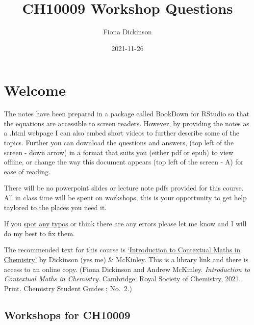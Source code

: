 \documentclass[
]{book}
\title{CH10009 Workshop Questions}
\author{Fiona Dickinson}
\date{2021-11-26}
\begin{document}
\maketitle

{
\setcounter{tocdepth}{1}
\tableofcontents
}
\hypertarget{welcome}{%
\chapter*{Welcome}\label{welcome}}

The notes have been prepared in a package called BookDown for RStudio so that the equations are accessible to screen readers. However, by providing the notes as a .html webpage I can also embed short videos to further describe some of the topics. Further you can download the questions and answers, (top left of the screen - down arrow) in a format that suits you (either pdf or epub) to view offline, or change the way this document appears (top left of the screen - A) for ease of reading.

There will be no powerpoint slides or lecture note pdfs provided for this course. All in class time will be spent on workshops, this is your opportunity to get help taylored to the places you need it.

If you \href{https://docs.google.com/forms/d/1hxCt8XcQ8taLXfymZfl2LUOjHACQ4INnRK6GeArTxsc/edit}{spot any typos} or think there are any errors please let me know and I will do my best to fix them.

The recommended text for this course is \href{https://bath-ac-primo.hosted.exlibrisgroup.com/primo-explore/fulldisplay?docid=44BAT_ALMA_DS51100784580002761\&context=L\&vid=44BAT_VU1\&lang=en_US\&search_scope=CSCOP_44BAT_DEEP\&adaptor=Local\%20Search\%20Engine\&tab=local\&query=any,contains,contextual\%20maths\%20in\%20chemistry\&sortby=rank\&pcAvailability=false}{`Introduction to Contextual Maths in Chemistry'} by Dickinson (yes me) \& McKinley. This is a library link and there is access to an online copy. (Fiona Dickinson and Andrew McKinley. \emph{Introduction to Contextual Maths in Chemistry}. Cambridge: Royal Society of Chemistry, 2021. Print. Chemistry Student Guides ; No.~2.)

\hypertarget{workshops-for-ch10009}{%
\section*{Workshops for CH10009}\label{workshops-for-ch10009}}
\end{document}
